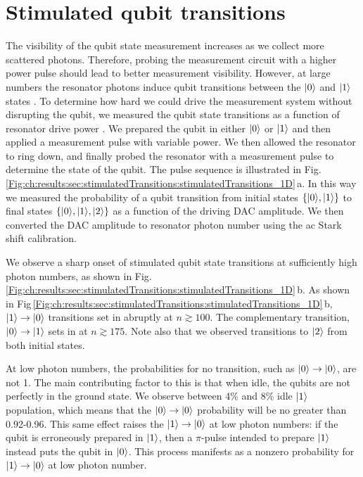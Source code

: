 \section{Stimulated qubit transitions}

The visibility of the qubit state measurement increases as we collect more scattered photons.
Therefore, probing the measurement circuit with a higher power pulse should lead to better measurement visibility.
However, at large numbers the resonator photons induce qubit transitions between the $|0\rangle$ and $|1\rangle$ states \cite{Johnson:heralding2012, Slichter:dressedDephasing2012}.
To determine how hard we could drive the measurement system without disrupting the qubit, we measured the qubit state transitions as a function of resonator drive power .
We prepared the qubit in either $|0\rangle$ or $|1\rangle$ and then applied a measurement pulse with variable power.
We then allowed the resonator to ring down, and finally probed the resonator with a measurement pulse to determine the state of the qubit.
The pulse sequence is illustrated in Fig.\,\ref{Fig:ch:results:sec:stimulatedTransitions:stimulatedTransitions_1D}\,a.
In this way we measured the probability of a qubit transition from initial states $\left\{ |0\rangle, |1\rangle \right\}$ to final states $\left\{ |0\rangle, |1\rangle, |2\rangle \right\}$ as a function of the driving DAC amplitude.
We then converted the DAC amplitude to resonator photon number using the ac Stark shift calibration. 

We observe a sharp onset of stimulated qubit state transitions at sufficiently high photon numbers, as shown in Fig.\,\ref{Fig:ch:results:sec:stimulatedTransitions:stimulatedTransitions_1D}\,b.
As shown in Fig\,\ref{Fig:ch:results:sec:stimulatedTransitions:stimulatedTransitions_1D}\,b, $|1\rangle\rightarrow|0\rangle$ transitions set in abruptly at $n \gtrsim 100$.
The complementary transition, $|0\rangle\rightarrow|1\rangle$ sets in at $n \gtrsim 175$.
Note also that we observed transitions to $|2\rangle$ from both initial states.

At low photon numbers, the probabilities for no transition, such as $|0\rangle\rightarrow|0\rangle$, are not 1.
The main contributing factor to this is that when idle, the qubits are not perfectly in the ground state.
We observe between 4\% and 8\% idle $|1\rangle$ population, which means that the $|0\rangle\rightarrow|0\rangle$ probability will be no greater than 0.92-0.96.
This same effect raises the $|1\rangle\rightarrow|0\rangle$ at low photon numbers: if the qubit is erroneously prepared in $|1\rangle$, then a $\pi$-pulse intended to prepare $|1\rangle$ instead puts the qubit in $|0\rangle$.
This process manifests as a nonzero probability for $|1\rangle\rightarrow|0\rangle$ at low photon number.

